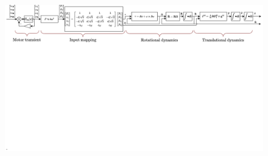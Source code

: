 \documentclass[aspectratio=169,9pt]{beamer}
\begin{document}
\begin{frame}
  \begin{figure}
    \includegraphics[width=1.0\textwidth]{./fig/schematics/full_dynamics.png}
  \end{figure}

\end{frame}


\end{document}
